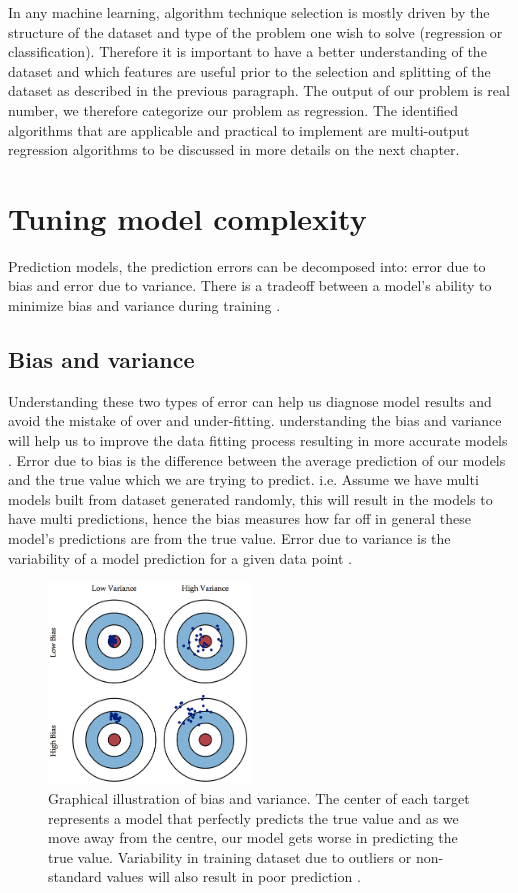 In any machine learning, algorithm technique selection is mostly driven by the structure of the dataset and type of the problem one wish to solve (regression or classification). Therefore it is important to have a better understanding of the dataset and which features are useful prior to the selection and splitting of the dataset as described in the previous paragraph. The output of our problem is real number, we therefore categorize our problem as regression. The identified algorithms that are applicable and practical to implement are multi-output regression algorithms to be discussed in more details on the next chapter. 


\section{Tuning model complexity}
\label{comp}
Prediction models, the prediction errors can be decomposed into: error due to bias and error due to variance. There is a tradeoff between a model's ability to minimize bias and variance during training \citep{fortmann2012understanding}. 
\subsection{Bias and variance }
Understanding these two types of error can help us diagnose model results and avoid the mistake of over and under-fitting. understanding the bias and variance will help us to improve the data fitting process resulting in more accurate models \citep{fortmann2012understanding}.
Error due to bias is the difference between the average prediction of our models and the true value which we are trying to predict. i.e. Assume we have multi models built from dataset generated randomly, this will result in the models to have multi predictions, hence the bias measures how far off in general these model's predictions are from the true value. Error due to variance is the variability of a model prediction for a given data point \citep{fortmann2012understanding}. 

\begin{figure}[H]
  \centering
    \includegraphics[width=0.48\textwidth]{images/Bias.png}
    \caption{Graphical illustration of bias and variance. The center of each target represents a model that perfectly predicts the true value and as we move away from the centre, our model gets worse in predicting the true value. Variability in training dataset due to outliers or non-standard values will also result in poor prediction \citep{fortmann2012understanding}.}
  \label{RC}
 \end{figure}
 

